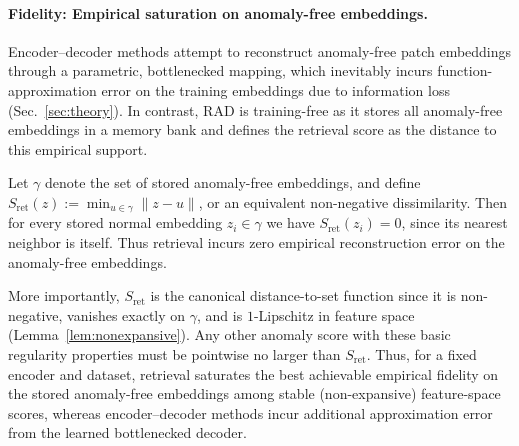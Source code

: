 \documentclass{article}
\theoremstyle{plain}
\theoremstyle{definition}
\theoremstyle{remark}
\begin{document}
\paragraph{Fidelity: Empirical saturation on anomaly-free embeddings.}
Encoder–decoder methods attempt to reconstruct anomaly-free patch embeddings
through a parametric, bottlenecked mapping, which inevitably incurs
function-approximation error on the training embeddings due to information loss
(Sec.~\ref{sec:theory}).
In contrast, RAD is training-free as it stores all anomaly-free embeddings in a
memory bank and defines the retrieval score as the distance to this empirical support.

Let $\gamma$ denote the set of stored anomaly-free embeddings, and define
$S_{\mathrm{ret}}(z) := \min_{u \in \gamma} \|z - u\|$, or an equivalent
non-negative dissimilarity.
Then for every stored normal embedding $z_i \in \gamma$ we have
$S_{\mathrm{ret}}(z_i) = 0$, since its
nearest neighbor is itself.
Thus retrieval incurs zero empirical reconstruction error on the anomaly-free embeddings.

More importantly, $S_{\mathrm{ret}}$ is the canonical distance-to-set function since it is non-negative, vanishes exactly on $\gamma$, and is $1$-Lipschitz in
feature space (Lemma~\ref{lem:nonexpansive}).
Any other anomaly score with these basic regularity properties must be
pointwise no larger than $S_{\mathrm{ret}}$.
Thus, for a fixed encoder and dataset, retrieval saturates the best achievable empirical fidelity on the stored anomaly-free embeddings among stable (non-expansive) feature-space scores,
whereas encoder–decoder methods incur
additional approximation error from the learned bottlenecked decoder.
\end{document}
